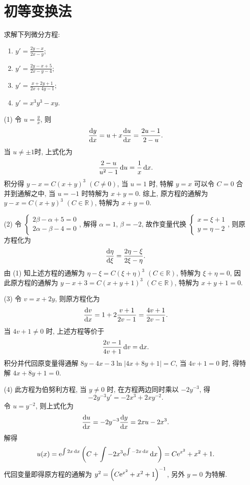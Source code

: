 \section{初等变换法}



\begin{exercise}
  求解下列微分方程:
  \begin{enumerate}[(1)]
  \item $\displaystyle y'=\frac{2y-x}{2x-y}$;
  \item $\displaystyle y'=\frac{2y-x+5}{2x-y-4}$;
  \item $\displaystyle y'=\frac{x+2y+1}{2x+4y-1}$;
  \item $\displaystyle y'=x^3y^3-xy$.
  \end{enumerate}
\end{exercise}

\begin{solution}
  (1) 令 $u=\frac{y}{x}$, 则
  \[\frac{\mathop{}\!\mathrm{d} y}{\mathop{}\!\mathrm{d} x}=u+x\frac{\mathop{}\!\mathrm{d} u}{\mathop{}\!\mathrm{d} x}=\frac{2u-1}{2-u}.\]
  当 $u\neq\pm 1$时, 上式化为
  \[\frac{2-u}{u^2-1}\mathop{}\!\mathrm{d} u = \frac{1}{x}\mathop{}\!\mathrm{d} x.\]
  积分得 $y-x=C(x+y)^3$ $(C\neq 0)$, 
  当 $u=1$ 时, 特解 $y=x$ 可以令 $C=0$ 合并到通解之中, 当 $u=-1$ 时特解为 $x+y=0$.
  综上, 原方程的通解为 $y-x=C(x+y)^3$ $(C\in\mathbb{R})$, 特解为 $x+y=0$.

  (2) 令 $\begin{cases}2\beta-\alpha+5=0\\2\alpha-\beta-4=0\end{cases}$,
  解得 $\alpha=1$, $\beta=-2$,
  故作变量代换 $\begin{cases}x=\xi+1\\y=\eta-2\end{cases}$, 则原方程化为
  \[\frac{\mathop{}\!\mathrm{d}\eta}{\mathop{}\!\mathrm{d}\xi}=\frac{2\eta-\xi}{2\xi-\eta}.\]
  由 (1) 知上述方程的通解为 $\eta-\xi=C(\xi+\eta)^3$ $(C\in\mathbb{R})$, 特解为 $\xi+\eta=0$,
  因此原方程的通解为 $y-x+3=C(x+y+1)^3$ $(C\in\mathbb{R})$, 特解为 $x+y+1=0$.

  (3) 令 $v=x+2y$, 则原方程化为
  \[\frac{\mathop{}\!\mathrm{d} v}{\mathop{}\!\mathrm{d} x}=1+2\frac{v+1}{2v-1}=\frac{4v+1}{2v-1}.\]
  当 $4v+1\neq 0$ 时, 上述方程等价于
  \[\frac{2v-1}{4v+1}\mathop{}\!\mathrm{d} v=\mathop{}\!\mathrm{d} x.\]
  积分并代回原变量得通解 $8y-4x-3\ln|4x+8y+1|=C$, 当 $4v+1=0$ 时, 得特解 $4x+8y+1=0$.

  (4) 此方程为伯努利方程, 当 $y\neq 0$ 时, 在方程两边同时乘以 $-2y^{-3}$, 得
  \[-2y^{-3}y'=-2x^3+2xy^{-2}.\]
  令 $u=y^{-2}$, 则上式化为
  \[\frac{\mathop{}\!\mathrm{d} u}{\mathop{}\!\mathrm{d} x}=-2y^{-3}\frac{\mathop{}\!\mathrm{d} y}{\mathop{}\!\mathrm{d} x}=2xu-2x^3.\]
  解得
  \[u(x)=\mathrm{e}^{\int2x\mathop{}\!\mathrm{d} x}\left(C+\int-2x^3\mathrm{e}^{\int-2x\mathop{}\!\mathrm{d} x}\mathop{}\!\mathrm{d} x\right)=C\mathrm{e}^{x^2}+x^2+1.\]
  代回变量即得原方程的通解为 $y^2=\left(C\mathrm{e}^{x^2}+x^2+1\right)^{-1}$, 另外 $y=0$ 为特解.
\end{solution}




